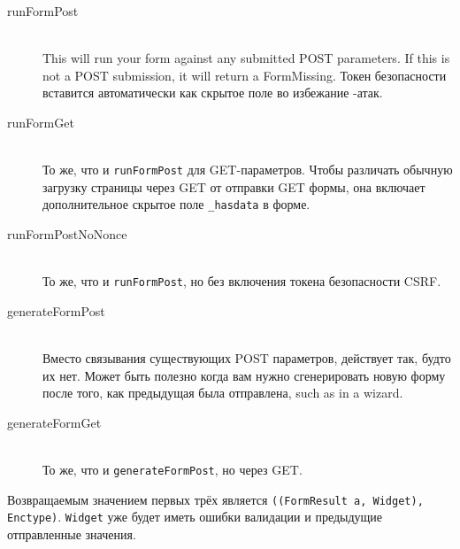 \begin{description}
\item[runFormPost] \hfill \\
This will run your form against any submitted POST parameters.
 If this is not a POST
submission, it will return a FormMissing. Токен безопасности вставится автоматически
как скрытое поле во избежание 
-атак.

\item[runFormGet] \hfill \\
То же, что и \lstinline'runFormPost' для GET-параметров. Чтобы различать обычную
загрузку страницы через GET от отправки GET формы, она включает дополнительное скрытое
поле \lstinline'_hasdata' в форме.

\item[runFormPostNoNonce] \hfill \\
То же, что и \lstinline'runFormPost', но без включения токена безопасности CSRF.

\item[generateFormPost] \hfill \\
Вместо связывания существующих POST параметров, действует так, будто их нет. Может
быть полезно когда вам нужно сгенерировать новую форму после того, как предыдущая была
отправлена, such as in a wizard.

\item[generateFormGet] \hfill \\
То же, что и \lstinline'generateFormPost', но через GET.
\end{description}

Возвращаемым значением первых трёх является \lstinline'((FormResult a, Widget), Enctype)'.
\lstinline'Widget' уже будет иметь ошибки валидации и предыдущие отправленные значения.

